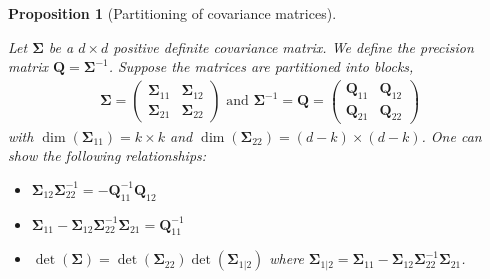 \documentclass[
  11pt,
  letterpaper,
]{scrbook}
\providecommand{\tightlist}{%
  \setlength{\itemsep}{0pt}\setlength{\parskip}{0pt}}\usepackage{longtable,booktabs,array}
\theoremstyle{definition}
\theoremstyle{definition}
\theoremstyle{definition}
\theoremstyle{plain}
\newtheorem{proposition}{Proposition}[chapter]
\theoremstyle{plain}
\theoremstyle{remark}
\begin{document}
\begin{proposition}[Partitioning of covariance
matrices]\protect\hypertarget{prp-partition-matrix}{}\label{prp-partition-matrix}

Let \(\boldsymbol{\Sigma}\) be a \(d \times d\) positive definite
covariance matrix. We define the precision matrix
\(\boldsymbol{Q} = \boldsymbol{\Sigma}^{-1}\). Suppose the matrices are
partitioned into blocks, \begin{align*}
\boldsymbol{\Sigma}= 
\begin{pmatrix}
\boldsymbol{\Sigma}_{11} & \boldsymbol{\Sigma}_{12} \\
\boldsymbol{\Sigma}_{21} & \boldsymbol{\Sigma}_{22}
\end{pmatrix} \text{ and }
\boldsymbol{\Sigma}^{-1}= \boldsymbol{Q} = 
\begin{pmatrix} 
\boldsymbol{Q}_{11} &\boldsymbol{Q}_{12}
\\ \boldsymbol{Q}_{21} & \boldsymbol{Q}_{22}
\end{pmatrix}
\end{align*} with \(\dim(\boldsymbol{\Sigma}_{11})=k\times k\) and
\(\dim(\boldsymbol{\Sigma}_{22})=(d-k) \times (d-k)\). One can show the
following relationships:

\begin{itemize}
\tightlist
\item
  \(\boldsymbol{\Sigma}_{12}\boldsymbol{\Sigma}_{22}^{-1}=-\boldsymbol{Q}_{11}^{-1}\boldsymbol{Q}_{12}\)
\item
  \(\boldsymbol{\Sigma}_{11}-\boldsymbol{\Sigma}_{12}\boldsymbol{\Sigma}_{22}^{-1}\boldsymbol{\Sigma}_{21}=\boldsymbol{Q}_{11}^{-1}\)
\item
  \(\det(\boldsymbol{\Sigma})=\det(\boldsymbol{\Sigma}_{22})\det(\boldsymbol{\Sigma}_{1|2})\)
  where
  \(\boldsymbol{\Sigma}_{1|2}=\boldsymbol{\Sigma}_{11}-\boldsymbol{\Sigma}_{12}\boldsymbol{\Sigma}_{22}^{-1}\boldsymbol{\Sigma}_{21}\).
\end{itemize}

\end{proposition}
\end{document}

